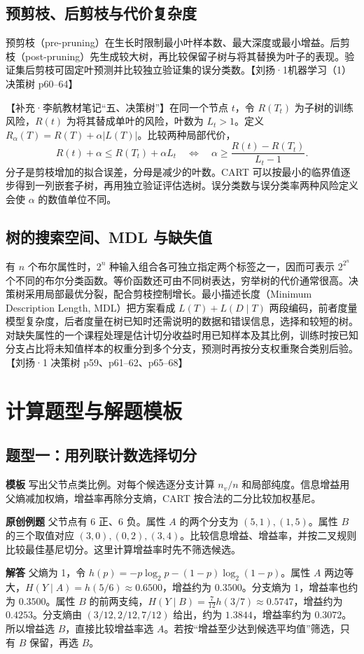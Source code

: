 \documentclass[UTF8,a4paper,zihao=-4,fontset=fandol]{ctexrep}
\begin{document}
\subsection*{预剪枝、后剪枝与代价复杂度}
预剪枝（pre-pruning）在生长时限制最小叶样本数、最大深度或最小增益。后剪枝（post-pruning）先生成较大树，再比较保留子树与将其替换为叶子的表现。验证集后剪枝可固定叶预测并比较独立验证集的误分类数。【刘扬·1机器学习（1）决策树 p60–64】

【补充·李航教材笔记“五、决策树”】在同一个节点 $t$，令 $R(T_t)$ 为子树的训练风险，$R(t)$ 为将其替成单叶的风险，叶数为 $L_t>1$。定义 $R_\alpha(T)=R(T)+\alpha |L(T)|$。比较两种局部代价，
\[
 R(t)+\alpha\le R(T_t)+\alpha L_t
 \quad\Longleftrightarrow\quad
 \alpha\ge\frac{R(t)-R(T_t)}{L_t-1}.
\]
分子是剪枝增加的拟合误差，分母是减少的叶数。CART 可以按最小的临界值逐步得到一列嵌套子树，再用独立验证评估选树。误分类数与误分类率两种风险定义会使 $\alpha$ 的数值单位不同。

\subsection*{树的搜索空间、MDL 与缺失值}
有 $n$ 个布尔属性时，$2^n$ 种输入组合各可独立指定两个标签之一，因而可表示 $2^{2^n}$ 个不同的布尔分类函数。等价函数还可由不同树表达，穷举树的代价通常很高。决策树采用局部最优分裂，配合剪枝控制增长。最小描述长度（Minimum Description Length, MDL）把方案看成 $L(T)+L(D\mid T)$ 两段编码，前者度量模型复杂度，后者度量在树已知时还需说明的数据和错误信息，选择和较短的树。对缺失属性的一个课程处理是估计切分收益时用已知样本及其比例，训练时按已知分支占比将未知值样本的权重分到多个分支，预测时再按分支权重聚合类别后验。【刘扬·1 决策树 p59、p61–62、p65–68】

\section{计算题型与解题模板}
\subsection*{题型一：用列联计数选择切分}
\textbf{模板} 写出父节点类比例。对每个候选逐分支计算 $n_v/n$ 和局部纯度。信息增益用父熵减加权熵，增益率再除分支熵，CART 按合法的二分比较加权基尼。

\textbf{原创例题} 父节点有 6 正、6 负。属性 $A$ 的两个分支为 $(5,1),(1,5)$。属性 $B$ 的三个取值对应 $(3,0),(0,2),(3,4)$。比较信息增益、增益率，并按二叉规则比较最佳基尼切分。这里计算增益率时先不筛选候选。

\textbf{解答} 父熵为 1，令 $h(p)=-p\log_2p-(1-p)\log_2(1-p)$。属性 $A$ 两边等大，$H(Y\mid A)=h(5/6)\approx0.6500$，增益约为 $0.3500$。分支熵为 1，增益率也约为 $0.3500$。属性 $B$ 的前两支纯，$H(Y\mid B)=\frac7{12}h(3/7)\approx0.5747$，增益约为 $0.4253$。分支熵由 $(3/12,2/12,7/12)$ 给出，约为 $1.3844$，增益率约为 $0.3072$。所以增益选 $B$，直接比较增益率选 $A$。若按“增益至少达到候选平均值”筛选，只有 $B$ 保留，再选 $B$。
\end{document}
